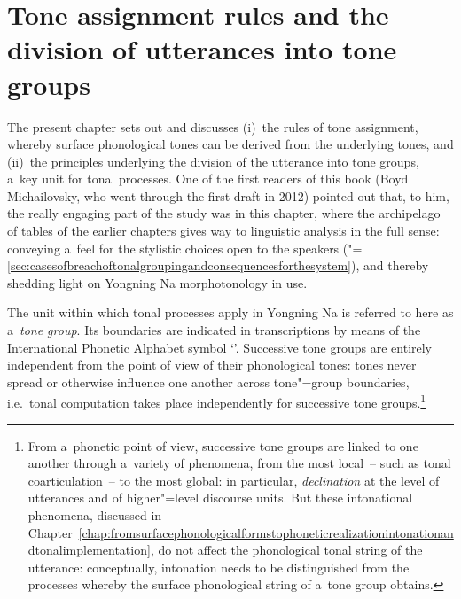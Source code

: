 \chapter{Tone assignment rules and the division of utterances into tone groups}
\label{chap:toneassignmentrulesandthedivisionoftheutteranceintotonegroups}


The present chapter sets out and discusses (i)~the rules of tone assignment, {\linebreak}whereby
surface phonological tones can be derived from the underlying tones, and (ii)~the principles underlying the division of the utterance into tone groups, a~key unit for tonal processes. One of the first readers of this book (Boyd Michailovsky, who went through the first draft in 2012) pointed out that, to him, the really engaging part of the study was in this chapter, where the archipelago of tables of the earlier chapters gives way to linguistic analysis in the full sense: conveying a~feel for the stylistic choices open to the speakers ("=\ref{sec:casesofbreachoftonalgroupingandconsequencesforthesystem}), and thereby shedding light on Yongning Na morphotonology in use. 

The unit within which tonal processes apply in Yongning Na is
referred to here as a~\textit{tone group}. Its boundaries are indicated in transcriptions by means of the International Phonetic
Alphabet symbol ‘\ipa{|}’. Successive tone groups are entirely independent from the point of view of
their phonological tones: tones never spread or otherwise influence one another across tone"=group
boundaries, i.e.\ tonal computation takes place independently for
successive tone groups.\footnote{From a~phonetic point of view, successive tone groups are linked to one another through a~variety of phenomena, from the most local~-- such as tonal {coarticulation}~-- to the most global: in particular, \textit{declination} at the level of utterances and of higher"=level discourse units. But these intonational
phenomena, discussed in Chapter~\ref{chap:fromsurfacephonologicalformstophoneticrealizationintonationandtonalimplementation}, do not affect the phonological tonal string of the utterance: conceptually, {intonation} needs to be
distinguished from the processes whereby the surface phonological string of a~tone group
obtains.} 

